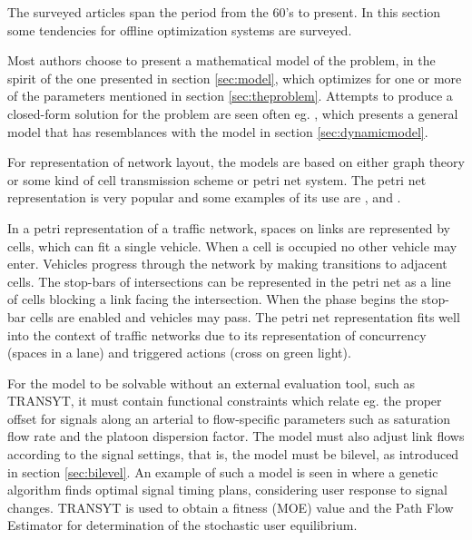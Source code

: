 \label{sec:offline}

The surveyed articles span the period from the 60's to present. In
this section some tendencies for offline optimization systems are
surveyed.

Most authors choose to present a mathematical model of the problem, in
the spirit of the one presented in section \ref{sec:model}, which
optimizes for one or more of the parameters mentioned in section
\ref{sec:theproblem}. Attempts to produce a closed-form solution for the
problem are seen often eg. \citet{36}, which presents a general model
that has resemblances with the model in section \ref{sec:dynamicmodel}.

For representation of network layout, the models are based on either
graph theory or some kind of cell transmission scheme or petri net
system. The petri net representation is very popular and some examples
of its use are \citet{12}, \citet{16} and \citet{petri}.

In a petri representation of a traffic network, spaces on links are
represented by cells, which can fit a single vehicle. When a cell is
occupied no other vehicle may enter. Vehicles progress through the
network by making transitions to adjacent cells. The stop-bars of
intersections can be represented in the petri net as a line of cells
blocking a link facing the intersection. When the phase begins the
stop-bar cells are enabled and vehicles may pass.  The petri net
representation fits well into the context of traffic networks due to
its representation of concurrency (spaces in a lane) and triggered
actions (cross on green light).

For the model to be solvable without an external evaluation tool, such
as TRANSYT, it must contain functional constraints which relate
eg. the proper offset for signals along an arterial to flow-specific
parameters such as saturation flow rate and the platoon dispersion
factor.  The model must also adjust link flows according to the signal
settings, that is, the model must be bilevel, as introduced in section
\ref{sec:bilevel}. An example of such a model is seen in \citet{33} where a
genetic algorithm finds optimal signal timing plans, considering user
response to signal changes. TRANSYT is used to obtain a fitness (MOE)
value and the Path Flow Estimator for determination of the stochastic
user equilibrium.

